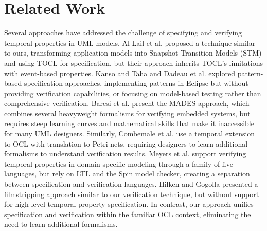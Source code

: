 \section{Related Work}
\hspace{1cm} Several approaches have addressed the challenge of specifying and verifying temporal 
properties in UML models. Al Lail et al. \cite{TPV} proposed a technique similar to 
ours, transforming application models into Snapshot Transition Models (STM) and using 
TOCL for specification, but their approach inherits TOCL's limitations with 
event-based properties. Kanso and Taha \cite{TOCL_Taha} and Dadeau et al. 
\cite{verification_TOCL_Taha} explored pattern-based specification approaches, 
implementing patterns in Eclipse but without providing verification capabilities, 
or focusing on model-based testing rather than comprehensive verification. Baresi 
et al. \cite{MADES} present the MADES approach, which combines several heavyweight 
formalisms for verifying embedded systems, but requires steep learning curves and 
mathematical skills that make it inaccessible for many UML designers. Similarly, 
Combemale et al. \cite{Combemale_related_work_2} use a temporal extension to OCL 
with translation to Petri nets, requiring designers to learn additional formalisms 
to understand verification results. Meyers et al. \cite{ProMoBox_related_work_3} 
support verifying temporal properties in domain-specific modeling through a family 
of five languages, but rely on LTL and the Spin model checker, creating a separation 
between specification and verification languages. Hilken and Gogolla 
\cite{verifying_filmstripping} presented a filmstripping approach similar to our 
verification technique, but without support for high-level temporal property 
specification. In contrast, our approach unifies specification and verification 
within the familiar OCL context, eliminating the need to learn additional formalisms.


